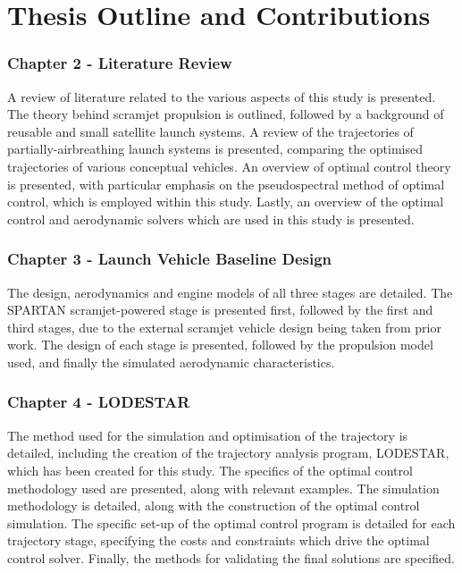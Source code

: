  \clearpage
  \section{Thesis Outline and Contributions}

    

    \subsubsection*{Chapter 2 - Literature Review}

      A review of literature related to the various aspects of this study is presented. The theory behind scramjet propulsion is outlined, followed by a background of reusable and small satellite launch systems. A review of the trajectories of partially-airbreathing launch systems is presented, comparing the optimised trajectories of various conceptual vehicles. An overview of optimal control theory is presented, with particular emphasis on the pseudospectral method of optimal control, which is employed within this study. Lastly, an overview of the optimal control and aerodynamic solvers which are used in this study is presented.
      

    \subsubsection*{Chapter 3 - Launch Vehicle Baseline Design}

      The design, aerodynamics and engine models of all three stages are detailed. The SPARTAN scramjet-powered stage is presented first, followed by the first and third stages, due to the external scramjet vehicle design being taken from prior work. The design of each stage is presented, followed by the propulsion model used, and finally the simulated aerodynamic characteristics. 
      
      
      \subsubsection*{Chapter 4 - LODESTAR}
      
      The method used for the simulation and optimisation of the trajectory is detailed, including the creation of the trajectory analysis program, LODESTAR, which has been created for this study. The specifics of the optimal control methodology used are presented, along with relevant examples. The simulation methodology is detailed, along with the construction of the optimal control simulation. The specific set-up of the optimal control program is detailed for each trajectory stage, specifying the costs and constraints which drive the optimal control solver. Finally, the methods for validating the final solutions are specified.
      
